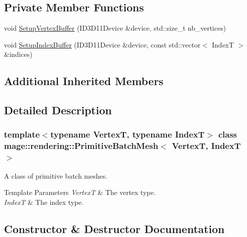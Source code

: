 \subsection*{Private Member Functions}
\begin{DoxyCompactItemize}
\item 
void \mbox{\hyperlink{classmage_1_1rendering_1_1_primitive_batch_mesh_a464a053d8b74f2cbdfd5e13264b91321}{Setup\+Vertex\+Buffer}} (I\+D3\+D11\+Device \&device, std\+::size\+\_\+t nb\+\_\+vertices)
\item 
void \mbox{\hyperlink{classmage_1_1rendering_1_1_primitive_batch_mesh_abe1802b8f201be6ced30199fbce6e852}{Setup\+Index\+Buffer}} (I\+D3\+D11\+Device \&device, const std\+::vector$<$ IndexT $>$ \&indices)
\end{DoxyCompactItemize}
\subsection*{Additional Inherited Members}


\subsection{Detailed Description}
\subsubsection*{template$<$typename VertexT, typename IndexT$>$\newline
class mage\+::rendering\+::\+Primitive\+Batch\+Mesh$<$ Vertex\+T, Index\+T $>$}

A class of primitive batch meshes.


\begin{DoxyTemplParams}{Template Parameters}
{\em VertexT} & The vertex type. \\
\hline
{\em IndexT} & The index type. \\
\hline
\end{DoxyTemplParams}


\subsection{Constructor \& Destructor Documentation}
\mbox{\label{classmage_1_1rendering_1_1_primitive_batch_mesh_a9971577eb819b1b2c97ff867cd031942}} 
